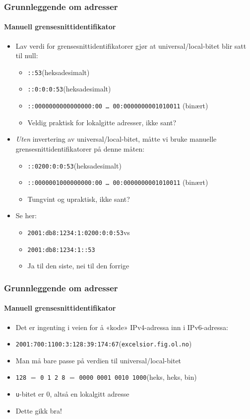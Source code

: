 \begin{frame}%
  \frametitle{Grunnleggende om adresser}
  \framesubtitle{Manuell grensesnittidentifikator}
  \begin{itemize}%
  \item Lav verdi for grensesnittidentifikatorer gjør at
    universal/local-bitet blir satt til null:
    \begin{itemize}%
    \item \texttt{::53}\hfill(heksadesimalt)
    \item \texttt{::\alert{0}:0:0:53}\hfill(heksadesimalt)
    \item \texttt{::000000\alert{0}000000000:00~\dots~00:0000000001010011}
      \hfill(binært)
    \item Veldig praktisk for lokalgitte adresser, ikke sant?
    \end{itemize}
  \item \textit{Uten\/} invertering av universal/local-bitet, måtte vi
    bruke manuelle grensesnittidentifikatorer på denne måten:
    \begin{itemize}%
    \item \texttt{::0\alert{2}00:0:0:53}\hfill(heksadesimalt)
    \item \texttt{::000000\alert{1}000000000:00~\dots~00:0000000001010011}
      \hfill(binært)
    \item Tungvint og upraktisk, ikke sant?
    \end{itemize}
  \item Se her:
    \begin{itemize}%
    \item \texttt{2001:db8:1234:1:0200:0:0:53}\quad vs
    \item \texttt{2001:db8:1234:1::53}
    \item Ja til den siste, nei til den forrige
    \end{itemize}
  \end{itemize}
\end{frame}

\begin{frame}%
  \frametitle{Grunnleggende om adresser}
  \framesubtitle{Manuell grensesnittidentifikator}
  \begin{itemize}%
  \item Det er ingenting i veien for å «kode» IPv4-adressa inn i
    IPv6-adressa:
  \item \texttt{2001:700:1100:3:\alert{128:39:174:67}}\hfill(\texttt{excelsior.fig.ol.no})
  \item Man må bare passe på verdien til universal/local-bitet
  \item \texttt{128} \(=\) \texttt{0 1 2 8} \(=\) \texttt{0000 00\alert{0}1 0010 1000}\hfill(heks, heks, bin)
  \item \texttt{u}-bitet er \(0\), altså en lokalgitt adresse
  \item Dette gikk bra!
  \end{itemize}
\end{frame}

